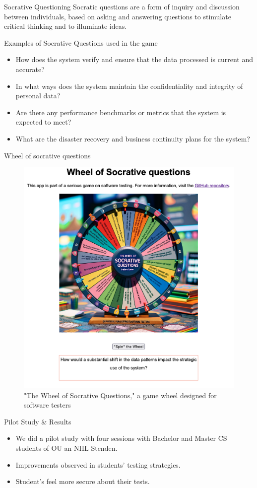 \documentclass[aspectratio=169]{beamer}
\begin{document}
\begin{frame}{Socrative Questioning}
    Socratic questions are a form of inquiry and discussion between individuals, based on asking and answering questions to stimulate critical thinking and to illuminate ideas.
\end{frame}

\begin{frame}{Examples of Socrative Questions used in the game}
    \begin{itemize}
        \item How does the system verify and ensure that the data processed is current and accurate?
        \item In what ways does the system maintain the confidentiality and integrity of personal data?
        \item Are there any performance benchmarks or metrics that the system is expected to meet?
        \item What are the disaster recovery and business continuity plans for the system?
    \end{itemize}
\end{frame}

\begin{frame}{Wheel of socrative questions}
    \begin{figure}
        \centering
        \includegraphics[width=0.5\linewidth]{images//wheel}
        \caption{"The Wheel of Socrative Questions," a game wheel designed for software testers}
    \end{figure}
\end{frame}

\begin{frame}{Pilot Study \& Results}
    \begin{itemize}
        \item We did a pilot study with four sessions with Bachelor and Master CS students of OU an NHL Stenden.
        \item Improvements observed in students' testing strategies.
        \item Student's feel more secure about their tests.
    \end{itemize}
\end{frame}
\end{document}
